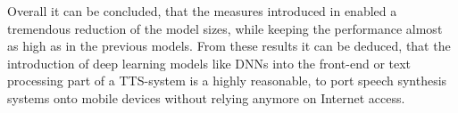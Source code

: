 Overall it can be concluded, that the measures introduced in \cite{boros:robust} enabled a tremendous reduction of the model sizes, while keeping the performance almost as high as in the previous models. From these results it can be deduced, that the introduction of deep learning models like \acp{DNN} into the front-end or text processing part of a \ac{TTS}-system is a highly reasonable, to port speech synthesis systems onto mobile devices without relying anymore on Internet access.